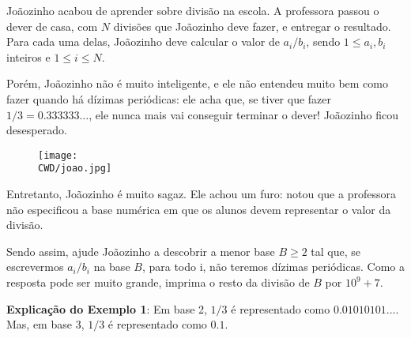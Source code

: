 %

Joãozinho acabou de aprender sobre divisão na escola. A professora passou o dever de casa, com $N$ divisões que Joãozinho deve fazer, e entregar o resultado. Para cada uma delas, Joãozinho deve calcular o valor de $a_i / b_i$, sendo $1 \leq a_i, b_i$ inteiros e $1 \leq i \leq N$.

Porém, Joãozinho não é muito inteligente, e ele não entendeu muito bem como fazer quando há dízimas periódicas: ele acha que, se tiver que fazer $1 / 3 = 0.333333\dots$, ele nunca mais vai conseguir terminar o dever! Joãozinho ficou desesperado.
\begin{figure}[H]
    \centering
    \texttt{[image: \\CWD/joao.jpg]}
\end{figure}
Entretanto, Joãozinho é muito sagaz. Ele achou um furo: notou que a professora não especificou a base numérica em que os alunos devem representar o valor da divisão.

Sendo assim, ajude Joãozinho a descobrir a menor base $B \geq 2$ tal que, se escrevermos $a_i / b_i$ na base $B$, para todo i, não teremos dízimas periódicas. Como a resposta pode ser muito grande, imprima o resto da divisão de $B$ por $10^9+7$.

%
%


%
%



\sampleio

\bigskip
\textbf{Explicação do Exemplo 1}: Em base 2, $1/3$ é representado como $0.01010101...$. Mas, em base 3, $1/3$ é representado como $0.1$.
